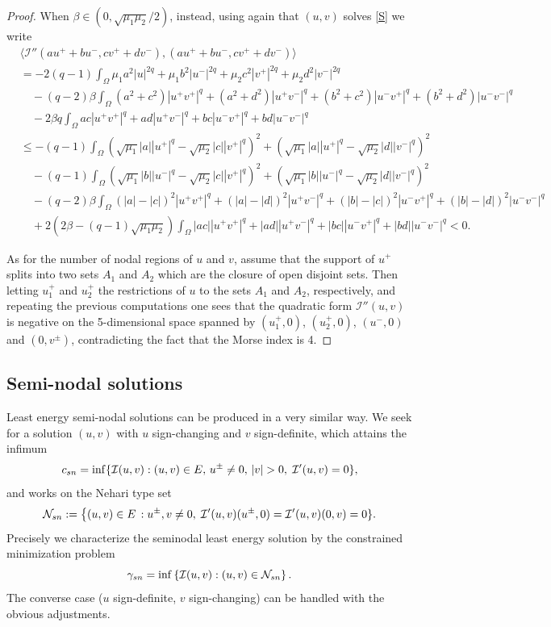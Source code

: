 \documentclass[10pt,a4paper]{amsart}
\numberwithin{equation}{section}
\begin{document}
\begin{proof}
When $\beta\in (0,\sqrt{\mu_1\mu_2}/2)$, instead, using again that $(u,v)$
solves \eqref{S} we write
\begin{align*}
&\langle\mathcal I''(au^++bu^-,cv^++dv^-) ,(au^++bu^-,cv^++dv^-) \rangle  \\
& = -2(q-1) \int_{\Omega}\mu_1 a^2 |u|^{2q} +\mu_1 b^2 |u^-|^{2q}
 + \mu_2 c^2|v^+|^{2q} + \mu_2 d^2|v^-|^{2q} \\
&\quad - (q-2)\beta \int_{\Omega} (a^2+c^2)|u^+ v^+|^q + (a^2+d^2)|u^+
  v^-|^q + (b^2+c^2)|u^- v^+|^q + (b^2+d^2)|u^- v^-|^q \\
&\quad -2\beta q \int_{\Omega} ac|u^+ v^+|^q + ad|u^+ v^-|^q + bc|u^- v^+|^q
 + bd|u^- v^-|^q \\
&\leq   -(q-1) \int_{\Omega}\left(\sqrt{\mu_1} |a| |u^+|^{q}
 - \sqrt{\mu_2}|c||v^+|^q\right)^2 + \left(\sqrt{\mu_1} |a| |u^+|^{q}
 - \sqrt{\mu_2}|d||v^-|^q\right)^2 \\
&\quad  -(q-1) \int_{\Omega}\left(\sqrt{\mu_1} |b| |u^-|^{q}
 - \sqrt{\mu_2}|c||v^+|^q\right)^2 + \left(\sqrt{\mu_1} |b| |u^-|^{q}
 - \sqrt{\mu_2}|d||v^-|^q\right)^2  \\
&\quad - (q-2)\beta \int_{\Omega} (|a|-|c|)^2|u^+ v^+|^q + (|a|-|d|)^2|u^+ v^-|^q
 + (|b|-|c|)^2|u^- v^+|^q + (|b|-|d|)^2|u^- v^-|^q
  \\
&\quad +2\left(2\beta -(q-1)\sqrt{\mu_1\mu_2} \right)\int_{\Omega} |ac||u^
 + v^+|^q + |ad||u^+ v^-|^q + |bc||u^- v^+|^q + |bd||u^- v^-|^q
 <0 .
 \end{align*}

As for the number of nodal regions of $u$ and $v$, assume that the support of $u^+$
splits into two sets $A_1$ and $A_2$ which are the closure of open disjoint sets.
Then letting $u^+_1$ and $u^+_2$ the restrictions of $u$ to the sets $A_1$ and $A_2$,
respectively, and repeating the previous computations one sees that the quadratic
form $\mathcal I''(u,v)$ is negative  on the 5-dimensional  space spanned by $(u^+_1,0)$,
$(u^+_2,0)$, $(u^-,0)$ and $(0,v^{\pm})$, contradicting the fact that the Morse index
is 4.
\end{proof}

\subsection{Semi-nodal solutions} \label{sub:seminodal}

Least energy semi-nodal solutions can be produced in a very similar way.
We seek for a solution $(u,v)$ with $u$ sign-changing and $v$ sign-definite,
which attains the infimum
\[
 c_{\rm sn} =\inf \{ \mathcal I(u,v) : (u,v)\in E,  \, u^{\pm}\neq 0,
  \,| v|>0 , \; \mathcal I'(u,v)=0  \},
 \]
and works on the Nehari type set
\begin{equation} \label{def:Neharisnod}
  \mathcal N_{\rm sn}:=  \big\{ (u,v)\in E\, :  u^{\pm}, v \neq 0, \;
   \mathcal I'(u,v)(u^{\pm},0)= \mathcal I'(u,v) (0,v)=0 \}.
\end{equation}
Precisely we characterize the seminodal least energy solution by the constrained
minimization problem
\[
\gamma_{\rm sn}=\inf \left\{ \mathcal I(u,v) : (u,v)\in \mathcal N_{\rm sn} \right\}.
\]
The converse case ($u$ sign-definite, $v$ sign-changing) can be handled with the
obvious adjustments.
\end{document}
